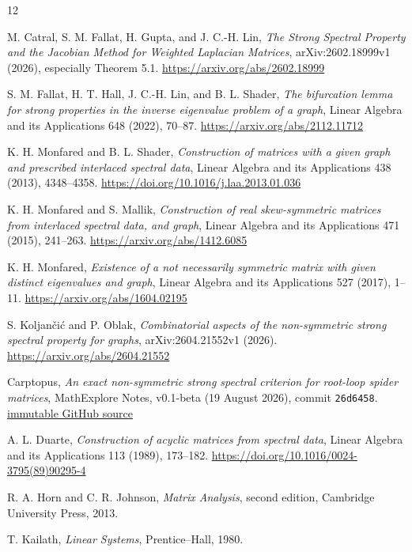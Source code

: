 \documentclass[11pt]{article}
\theoremstyle{remark}
\begin{document}
\begin{thebibliography}{12}

 M. Catral, S. M. Fallat, H. Gupta, and J. C.-H. Lin,
\emph{The Strong Spectral Property and the Jacobian Method for Weighted Laplacian Matrices},
arXiv:2602.18999v1 (2026), especially Theorem 5.1.
\url{https://arxiv.org/abs/2602.18999}

 S. M. Fallat, H. T. Hall, J. C.-H. Lin, and B. L. Shader,
\emph{The bifurcation lemma for strong properties in the inverse eigenvalue problem of a graph},
Linear Algebra and its Applications 648 (2022), 70--87.
\url{https://arxiv.org/abs/2112.11712}

 K. H. Monfared and B. L. Shader,
\emph{Construction of matrices with a given graph and prescribed interlaced spectral data},
Linear Algebra and its Applications 438 (2013), 4348--4358.
\url{https://doi.org/10.1016/j.laa.2013.01.036}

 K. H. Monfared and S. Mallik,
\emph{Construction of real skew-symmetric matrices from interlaced spectral data, and graph},
Linear Algebra and its Applications 471 (2015), 241--263.
\url{https://arxiv.org/abs/1412.6085}

 K. H. Monfared,
\emph{Existence of a not necessarily symmetric matrix with given distinct eigenvalues and graph},
Linear Algebra and its Applications 527 (2017), 1--11.
\url{https://arxiv.org/abs/1604.02195}

 S. Koljan\v{c}i\'{c} and P. Oblak,
\emph{Combinatorial aspects of the non-symmetric strong spectral property for graphs},
arXiv:2604.21552v1 (2026).
\url{https://arxiv.org/abs/2604.21552}

 Carptopus,
\emph{An exact non-symmetric strong spectral criterion for root-loop spider matrices},
MathExplore Notes, v0.1-beta (19 August 2026), commit \texttt{26d6458}.
\href{https://github.com/Carptopus/MathExplore-Notes/tree/26d6458029d09c59fd52a56ede4840ed7faf7bae/research/nssp-root-loop-spiders}{immutable GitHub source}

 A. L. Duarte,
\emph{Construction of acyclic matrices from spectral data},
Linear Algebra and its Applications 113 (1989), 173--182.
\url{https://doi.org/10.1016/0024-3795(89)90295-4}

 R. A. Horn and C. R. Johnson,
\emph{Matrix Analysis}, second edition, Cambridge University Press, 2013.

 T. Kailath,
\emph{Linear Systems}, Prentice--Hall, 1980.


\end{thebibliography}
\end{document}
